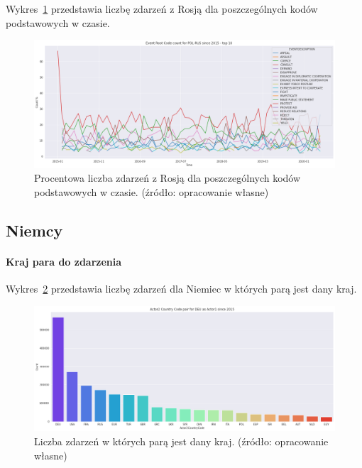 \documentclass[11pt]{report}
\begin{document}
    Wykres~\ref{fig:PLRUSERC} przedstawia liczbę zdarzeń z Rosją dla poszczególnych kodów podstawowych w czasie.
    \begin{figure}[!htp]
        \centering
        \includegraphics[width=1 \textwidth]{fig/PL/POLRUSERCperc.png}
        \caption{Procentowa liczba zdarzeń z Rosją dla poszczególnych kodów podstawowych w czasie. (źródło: opracowanie własne)}
        \label{fig:PLRUSERC}
    \end{figure}

    \subsection{Niemcy}

    \paragraph{Kraj para do zdarzenia}

    Wykres~\ref{fig:DEUpair} przedstawia liczbę zdarzeń dla Niemiec w których parą jest dany kraj.

    \begin{figure}[!htp]
        \centering
        \includegraphics[width=1 \textwidth]{fig/DEU/DEUactor2Pair.png}
        \caption{Liczba zdarzeń w których parą jest dany kraj. (źródło: opracowanie własne)}
        \label{fig:DEUpair}
    \end{figure}
\end{document}
